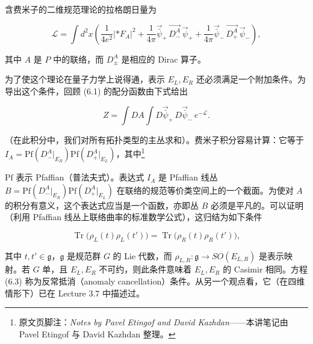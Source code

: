 含费米子的二维规范理论的拉格朗日量为

\begin{equation}
  \tag{6.1}
  \label{eq:6-1}
  \mathcal{L}=\int d^2x\left(\frac{1}{4e^2}|\ast F_A|^2+\frac{1}{4\pi}\overrightarrow{\bar\psi}_+\,\overrightarrow{D^A_-}\,\overrightarrow{\psi}_++\frac{1}{4\pi}\overrightarrow{\bar\psi}_-\,\overrightarrow{D^A_+}\,\overrightarrow{\psi}_-\right),
\end{equation}

其中 $A$ 是 $P$ 中的联络，而 $D^A_\pm$ 是相应的 Dirac 算子。


为了使这个理论在量子力学上说得通，表示 $E_L,E_R$ 还必须满足一个附加条件。为导出这个条件，回顾 (6.1) 的配分函数由下式给出

\begin{equation}
  \tag{6.2}
  \label{eq:6-2}
  Z=\int DA\int D\overrightarrow{\bar\psi}_+\,D\overrightarrow{\bar\psi}_-\,e^{-\mathcal{L}}.
\end{equation}

（在此积分中，我们对所有拓扑类型的主丛求和）。费米子积分容易计算：它等于 $I_A=\mathrm{Pf}(D^A_-|_{E_R})\mathrm{Pf}(D^A_+|_{E_L})$，其中\footnote{原文页脚注：\emph{Notes by Pavel Etingof and David Kazhdan}——本讲笔记由 Pavel Etingof 与 David Kazhdan 整理。}

$\mathrm{Pf}$ 表示 Pfaffian（普法夫式）。表达式 $I_A$ 是 Pfaffian 线丛 $B=\mathrm{Pf}(D^A_-|_{E_R})\mathrm{Pf}(D^A_+|_{E_L})$ 在联络的规范等价类空间上的一个截面。为使对 $A$ 的积分有意义，这个表达式应当是一个函数，亦即丛 $B$ 必须是平凡的。可以证明（利用 Pfaffian 线丛上联络曲率的标准数学公式），这归结为如下条件

\begin{equation}
  \tag{6.3}
  \label{eq:6-3}
  \operatorname{Tr}\big(\rho_L(t)\rho_L(t')\big)=\operatorname{Tr}\big(\rho_R(t)\rho_R(t')\big),
\end{equation}

其中 $t,t'\in\mathfrak{g}$，$\mathfrak{g}$ 是规范群 $G$ 的 Lie 代数，而 $\rho_{L,R}:\mathfrak{g}\to SO(E_{L,R})$ 是表示映射。若 $G$ 单，且 $E_L,E_R$ 不可约，则此条件意味着 $E_L,E_R$ 的 Casimir 相同。方程 (6.3) 称为反常抵消（anomaly cancellation）条件。从另一个观点看，它（在四维情形下）已在 Lecture 3.7 中描述过。

